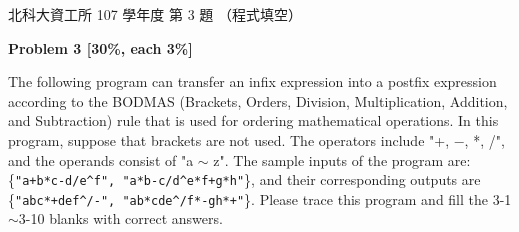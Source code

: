 \begin{pastexam}[label={px:ntut-107-prog-03}]{北科大資工所 107 學年度 第 3 題}
（程式填空）

\textbf{Problem 3 [30\%, each 3\%]}

The following program can transfer an infix expression into a postfix expression according to the
BODMAS (Brackets, Orders, Division, Multiplication, Addition, and Subtraction) rule that is used for
ordering mathematical operations. In this program, suppose that brackets are not used. The
operators include "+, $-$, *, /", and the operands consist of "a $\sim$ z". The sample inputs of
the program are: \{\texttt{"a+b*c-d/e\^{}f", "a*b-c/d\^{}e*f+g*h"}\}, and their corresponding
outputs are \{\texttt{"abc*+def\^{}/-", "ab*cde\^{}/f*-gh*+"}\}. Please trace this program and fill
the 3-1$\sim$3-10 blanks with correct answers.


\end{pastexam}
